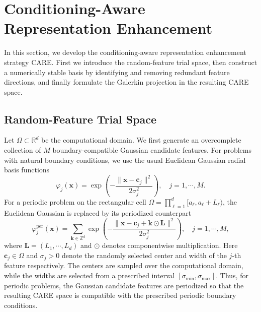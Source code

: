 \documentclass[10pt,reqno]{amsart}
\theoremstyle{remark}
\theoremstyle{definition}
\begin{document}
\section{Conditioning-Aware Representation Enhancement}
In this section, we develop the conditioning-aware representation enhancement strategy CARE. First we introduce the random-feature trial space, then construct a numerically stable basis by identifying and removing redundant feature directions, and finally formulate the Galerkin projection in the resulting CARE space.

\subsection{Random-Feature Trial Space}
Let $\Omega \subset \mathbb{R}^d$ be the computational domain. We first generate an overcomplete collection of $M$ boundary-compatible Gaussian candidate features. For problems with natural boundary conditions, we use the usual Euclidean Gaussian radial basis functions
\begin{equation}
  \varphi_j(\boldsymbol{x}) = \exp\left(-\frac{\|\boldsymbol{x}-\boldsymbol{c}_j\|^2}{2\sigma_j^2}\right), \quad j=1,\cdots,M.
  \label{eq:Euclidean-Gaussian-feature}
\end{equation}
For a periodic problem on the rectangular cell $\Omega=\prod_{\ell=1}^d[a_\ell,a_\ell+L_\ell)$, the Euclidean Gaussian is replaced by its periodized counterpart
\begin{equation}
  \varphi_j^{\mathrm{per}}(\boldsymbol{x})
  =\sum_{\boldsymbol{k}\in\mathbb Z^d}
  \exp\left(-\frac{\|\boldsymbol{x}-\boldsymbol{c}_j+\boldsymbol{k}\odot\boldsymbol L\|^2}{2\sigma_j^2}\right),
  \quad j=1,\cdots,M,
  \label{eq:periodized-Gaussian-feature}
\end{equation}
where $\boldsymbol L=(L_1,\cdots,L_d)$ and $\odot$ denotes componentwise multiplication. Here $\boldsymbol{c}_j \in \Omega$ and $\sigma_j > 0$ denote the randomly selected center and width of the $j$-th feature respectively. The centers are sampled over the computational domain, while the widths are selected from a prescribed interval $[\sigma_{\min}, \sigma_{\max}]$. Thus, for periodic problems, the Gaussian candidate features are periodized so that the resulting CARE space is compatible with the prescribed periodic boundary conditions.
\end{document}
